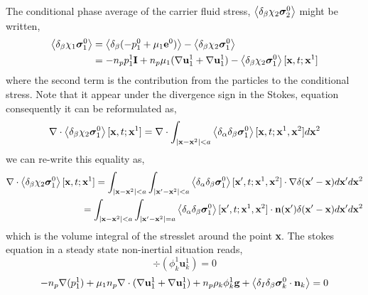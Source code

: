 The conditional phase average of the carrier fluid stress, $\left<\delta_\beta\chi_2 \bm\sigma_2^0\right>$ might be written,
\begin{align*}
    \left<\delta_\beta\chi_1 \bm\sigma_1^0\right>
    &= 
    \left<\delta_\beta (-p_1^0 + \mu_1 \textbf{e}^0 )\right>
    - \left<\delta_\beta\chi_2 \bm\sigma_1^0\right>\\
    &= 
    - n_p p_1^1 \textbf{I}
    + n_p \mu_1 (\mathbf{\nabla} \textbf{u}_1^1 + \mathbf{\nabla} \textbf{u}_1^1)
    - \left<\delta_\beta\chi_2 \bm\sigma_1^0\right>[\textbf{x},t;\textbf{x}^1]\\
\end{align*}
where the second term is the contribution from the particles to the conditional stress. 
Note that it appear under the divergence sign in the Stokes, equation consequently it can be reformulated as\citet{hinch1977averaged}, 
\begin{equation*}
    \mathbf{\nabla}\cdot \left<\delta_\beta\chi_2 \bm\sigma_1^0\right>[\textbf{x},t;\textbf{x}^1]
    =\mathbf{\nabla}\cdot\int_{|\textbf{x}-\textbf{x}^2| < a}
    \left<\delta_\alpha\delta_\beta \bm\sigma_1^0\right>[\textbf{x},t;\textbf{x}^1,\textbf{x}^2] d\textbf{x}^2
\end{equation*}
we can re-write this equality as, 
\begin{align*}
    \mathbf{\nabla}\cdot \left<\delta_\beta\chi_2 \bm\sigma_1^0\right>[\textbf{x},t;\textbf{x}^1]
    =
    \int_{|\textbf{x} -\textbf{x}^2|<a}
    \int_{|\textbf{x}'-\textbf{x}^2|<a}
    \left<\delta_\alpha\delta_\beta \bm\sigma_1^0\right>[\textbf{x}',t;\textbf{x}^1,\textbf{x}^2]
    \cdot \mathbf{\nabla} \delta(\textbf{x}' - \textbf{x})
    d\textbf{x}'
    d\textbf{x}^2\\
    =
    \int_{|\textbf{x}-\textbf{x}^2|<a}
    \int_{|\textbf{x}'-\textbf{x}^2|=a}
    \left<\delta_\alpha\delta_\beta \bm\sigma_1^0\right>[\textbf{x}',t;\textbf{x}^1,\textbf{x}^2]
    \cdot  \textbf{n}(\textbf{x}') \delta(\textbf{x}' - \textbf{x})
    d\textbf{x}'
    d\textbf{x}^2\\
\end{align*}
which is the volume integral of the stresslet around the point \textbf{x}. 
The stokes equation in a steady state non-inertial situation reads, 
\begin{equation}
    \div (\phi_k^1\textbf{u}_k^1)
    = 0
\end{equation}
\begin{equation}
    - n_p \mathbf{\nabla} (p_1^1)
    + \mu_1n_p \mathbf{\nabla}\cdot (\mathbf{\nabla} \textbf{u}_1^1 + \mathbf{\nabla} \textbf{u}_1^1)
    + n_p  \rho_k \phi_k^1 \textbf{g} 
    + \left<\delta_I\delta_\beta \bm\sigma_k^0 \cdot \textbf{n}_k\right>
    = 0 
\end{equation}
